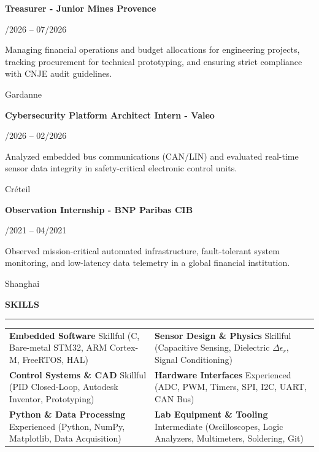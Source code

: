 \documentclass[10pt,a4paper]{article}
\newcommand{\cvSection}[1]{%
  \vspace{6.5pt}%
  {\fontsize{10.5}{12}\selectfont \textbf{#1}}\par\vspace{1.5pt}%
  \rule{\textwidth}{0.75pt}\par\vspace{4.5pt}%
}
\newcommand{\cvItem}[4]{%
  \noindent
  \parbox[t]{0.75\textwidth}{\raggedright \textbf{#1}}\hfill
  \parbox[t]{0.24\textwidth}{\raggedleft \fontsize{8.5}{10.5}\selectfont #2}\par
  \vspace{1.5pt}
  \noindent
  \parbox[t]{0.75\textwidth}{\fontsize{8.7}{11.2}\selectfont #4}\hfill
  \parbox[t]{0.24\textwidth}{\raggedleft \fontsize{8.5}{10.5}\selectfont #3}\par
  \vspace{5pt}
}
\begin{document}
\cvItem{Treasurer - Junior Mines Provence}{01/2026 -- 07/2026}{Gardanne}{Managing financial operations and budget allocations for engineering projects, tracking procurement for technical prototyping, and ensuring strict compliance with CNJE audit guidelines.}

\cvItem{Cybersecurity Platform Architect Intern - Valeo}{01/2026 -- 02/2026}{Créteil}{Analyzed embedded bus communications (CAN/LIN) and evaluated real-time sensor data integrity in safety-critical electronic control units.}

\cvItem{Observation Internship - BNP Paribas CIB}{04/2021 -- 04/2021}{Shanghai}{Observed mission-critical automated infrastructure, fault-tolerant system monitoring, and low-latency data telemetry in a global financial institution.}

\cvSection{SKILLS}
\begin{tabularx}{\textwidth}{@{}X X@{}}
  \textbf{Embedded Software} \newline
  {\fontsize{8.5}{10.5}\selectfont Skillful (C, Bare-metal STM32, ARM Cortex-M, FreeRTOS, HAL)} &
  \textbf{Sensor Design \& Physics} \newline
  {\fontsize{8.5}{10.5}\selectfont Skillful (Capacitive Sensing, Dielectric $\Delta\epsilon_r$, Signal Conditioning)} \\[4.5pt]
  
  \textbf{Control Systems \& CAD} \newline
  {\fontsize{8.5}{10.5}\selectfont Skillful (PID Closed-Loop, Autodesk Inventor, Prototyping)} &
  \textbf{Hardware Interfaces} \newline
  {\fontsize{8.5}{10.5}\selectfont Experienced (ADC, PWM, Timers, SPI, I2C, UART, CAN Bus)} \\[4.5pt]
  
  \textbf{Python \& Data Processing} \newline
  {\fontsize{8.5}{10.5}\selectfont Experienced (Python, NumPy, Matplotlib, Data Acquisition)} &
  \textbf{Lab Equipment \& Tooling} \newline
  {\fontsize{8.5}{10.5}\selectfont Intermediate (Oscilloscopes, Logic Analyzers, Multimeters, Soldering, Git)}
\end{tabularx}
\end{document}
